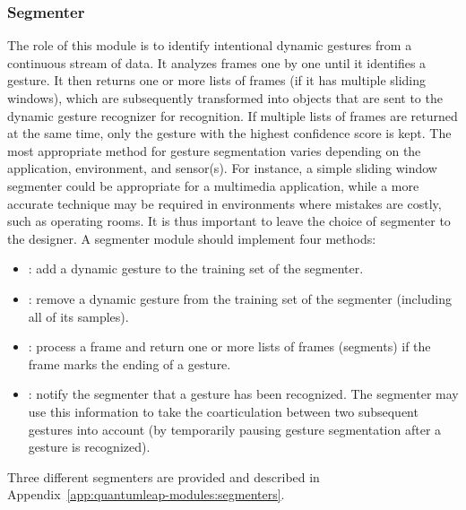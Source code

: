 \subsubsection{Segmenter}
The role of this module is to identify intentional dynamic gestures from a continuous stream of data. It analyzes frames one by one until it identifies a gesture. It then returns one or more lists of frames (\eg if it has multiple sliding windows), which are subsequently transformed into  objects that are sent to the dynamic gesture recognizer for recognition. If multiple lists of frames are returned at the same time, only the gesture with the highest confidence score is kept.
The most appropriate method for gesture segmentation varies depending on the application, environment, and sensor(s). For instance, a simple sliding window segmenter could be appropriate for a multimedia application, while a more accurate technique may be required in environments where mistakes are costly, such as operating rooms. It is thus important to leave the choice of segmenter to the designer. A segmenter module should implement four methods:
\begin{itemize}[noitemsep]
    \item {}: add a dynamic gesture to the training set of the segmenter.
    \item {}: remove a dynamic gesture from the training set of the segmenter (including all of its samples).
    \item {}: process a frame and return one or more lists of frames (\ie segments) if the frame marks the ending of a gesture.
    \item {}: notify the segmenter that a gesture has been recognized. The segmenter may use this information to take the coarticulation between two subsequent gestures into account (\eg by temporarily pausing gesture segmentation after a gesture is recognized).
\end{itemize}
Three different segmenters are provided and described in Appendix~\ref{app:quantumleap-modules:segmenters}.

